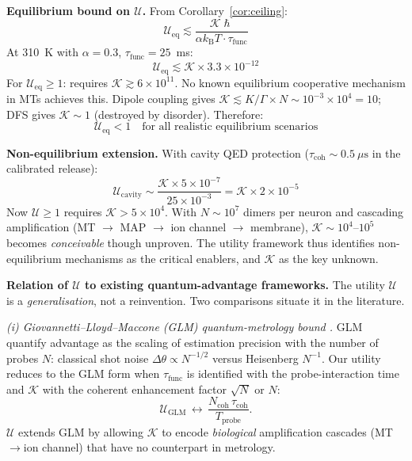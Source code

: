 \documentclass[twocolumn,10pt]{article}
\renewcommand{\hbar}{\hslash}
\newcommand{\kB}{k_{\text{B}}}
\begin{document}
\textbf{Equilibrium bound on $\mathcal{U}$.} From
Corollary~\ref{cor:ceiling}:
\begin{equation}
\mathcal{U}_{\text{eq}} \lesssim
\frac{\mathcal{K}\hbar}{\alpha\kB T \cdot \tau_{\text{func}}}
\end{equation}
At 310~K with $\alpha = 0.3$, $\tau_{\text{func}} = 25$~ms:
\begin{equation}
\mathcal{U}_{\text{eq}} \lesssim \mathcal{K} \times 3.3 \times 10^{-12}
\end{equation}
For $\mathcal{U}_{\text{eq}} \geq 1$: requires $\mathcal{K} \gtrsim 6\times
10^{11}$. No known equilibrium cooperative mechanism in MTs achieves this.
Dipole coupling gives $\mathcal{K} \lesssim K/\Gamma \times N \sim
10^{-3} \times 10^4 = 10$; DFS gives $\mathcal{K} \sim 1$ (destroyed by
disorder). Therefore:
\begin{equation}
\boxed{\mathcal{U}_{\text{eq}} < 1
\quad \text{for all realistic equilibrium scenarios}}
\end{equation}

\textbf{Non-equilibrium extension.} With cavity QED protection
($\tau_{\text{coh}} \sim 0.5~\mu\text{s}$ in the calibrated release):
\begin{equation}
\mathcal{U}_{\text{cavity}} \sim
\frac{\mathcal{K} \times 5\times 10^{-7}}{25 \times 10^{-3}}
= \mathcal{K} \times 2 \times 10^{-5}
\end{equation}
Now $\mathcal{U} \geq 1$ requires $\mathcal{K} > 5 \times 10^{4}$. With
$N \sim 10^7$ dimers per neuron and cascading amplification (MT $\to$ MAP
$\to$ ion channel $\to$ membrane), $\mathcal{K} \sim 10^4\text{--}10^5$
becomes \textit{conceivable} though unproven. The utility framework thus
identifies non-equilibrium mechanisms as the critical enablers, and
$\mathcal{K}$ as the key unknown.

\textbf{Relation of $\mathcal{U}$ to existing quantum-advantage frameworks.}
The utility $\mathcal{U}$ is a \emph{generalisation}, not a reinvention.
Two comparisons situate it in the literature.

\emph{(i) Giovannetti--Lloyd--Maccone (GLM) quantum-metrology bound
\cite{Giovannetti2004}.} GLM quantify advantage as the scaling of
estimation precision with the number of probes $N$: classical shot noise
$\Delta\theta\propto N^{-1/2}$ versus Heisenberg $N^{-1}$. Our utility
reduces to the GLM form when $\tau_{\text{func}}$ is identified with the
probe-interaction time and $\mathcal{K}$ with the coherent enhancement
factor $\sqrt{N}$ or $N$:
\begin{equation}
\mathcal{U}_{\text{GLM}}\,\longleftrightarrow\,
\frac{N_{\text{coh}}\,\tau_{\text{coh}}}{T_{\text{probe}}}.
\end{equation}
$\mathcal{U}$ extends GLM by allowing $\mathcal{K}$ to encode
\emph{biological} amplification cascades (MT$\to$ion channel) that have no
counterpart in metrology.
\end{document}
